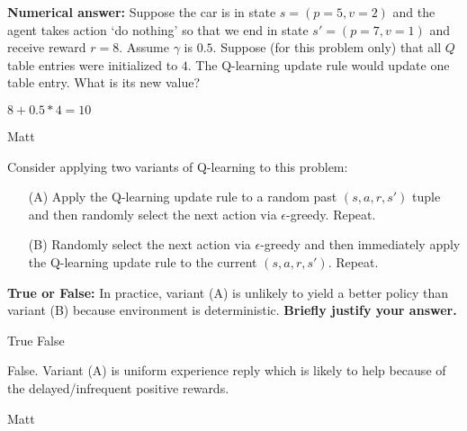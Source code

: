 \begin{parts}
\begin{subparts}
\subpart[2] \textbf{Numerical answer:} Suppose the car is in state $s = (p=5, v=2)$ and the agent takes action `do nothing' so that we end in state $s'= (p=7, v=1)$ and receive reward $r=8$. Assume $\gamma$ is $0.5$. Suppose (for this problem only) that all $Q$ table entries were initialized to $4$. The Q-learning update rule would update one table entry. What is its new value?
    \begin{tcolorbox}[fit,height=1cm, width=4cm, blank, borderline={1pt}{-2pt}]
    \end{tcolorbox}
    \begin{soln}
    $8 + 0.5 * 4 = 10$
    \end{soln}
    \begin{qauthor}
    Matt
    \end{qauthor}

\clearpage

\subpart[2] Consider applying two variants of Q-learning to this problem:
\begin{enumerate}
    \item[(A)] Apply the Q-learning update rule to a random past $(s, a, r, s')$ tuple and then randomly select the next action via $\epsilon$-greedy. Repeat.
    \item[(B)] Randomly select the next action via $\epsilon$-greedy and then immediately apply the Q-learning update rule to the current $(s, a, r, s')$. Repeat.
\end{enumerate}
\textbf{True or False:} In practice, variant (A) is unlikely to yield a better policy than variant (B) because environment is deterministic. \textbf{Briefly justify your answer.}
    \begin{checkboxes}
     \choice True 
     \choice False
    \end{checkboxes}
    \fillwithlines{8em}
    \begin{soln}
    False. Variant (A) is uniform experience reply which is likely to help because of the delayed/infrequent positive rewards.
    \end{soln}
    \begin{qauthor} Matt    \end{qauthor}


\end{subparts}
\end{parts}
